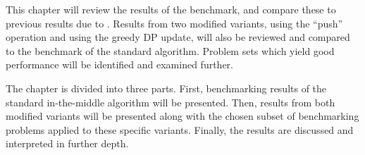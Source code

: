 This chapter will review the results of the benchmark, and compare these to previous results due to \textcite{deGivry14}.
Results from two modified variants, using the \enquote{push} operation and using the greedy DP update, will also be reviewed and compared to the benchmark of the standard algorithm.
Problem sets which yield good performance will be identified and examined further.

The chapter is divided into three parts.
First, benchmarking results of the standard in-the-middle algorithm will be presented.
Then, results from both modified variants will be presented along with the chosen subset of benchmarking problems applied to these specific variants.
Finally, the results are discussed and interpreted in further depth.

